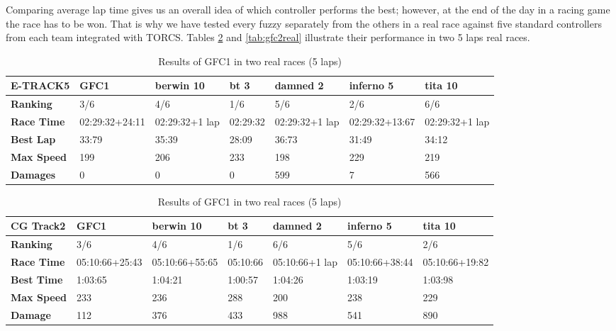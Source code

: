 \documentclass[sigconf]{acmart}
\begin{document}
Comparing average lap time gives us an overall idea of which
controller performs the best; however, at the end of the day in a
racing game the race has to be won. That is why we have tested every
fuzzy separately from the others in a real race against five standard controllers from each team integrated with TORCS. Tables \ref{tab:gfc1real} and \ref{tab:gfc2real}   illustrate their performance in two 5 laps real races. 
\begin{table}[!ht]
	\centering
	{\scriptsize
		\caption{Results of GFC1 in two real races (5 laps)}
		\label{tab:gfc1real}
		\begin{tabular}{|p{2 cm}|p{1.5 cm}|p{1.5 cm}|p{1.5 cm}|p{1.5 cm}|p{1.5 cm}|p{1.5 cm}|}
			\hline \textbf{E-TRACK5} &   \textbf{GFC1} & \textbf{berwin 10} & \textbf{bt 3} &\textbf{damned 2} & \textbf{inferno 5} & \textbf{tita 10}  \\
			\hline \textbf{Ranking} & 3/6&4/6&1/6&5/6&2/6&6/6\\			
			\hline \textbf{Race Time}	& 02:29:32\newline+24:11&02:29:32\newline +1 lap &02:29:32&02:29:32\newline +1 lap &02:29:32\newline+13:67&02:29:32\newline+1 lap\\	
			\hline \textbf{Best Lap}&33:79& 35:39&28:09&36:73&31:49&34:12\\	
			\hline \textbf{Max Speed}& 199&206&233&198&229&219\\	
			\hline \textbf{Damages}& 0&0&0&599&7&566 \\	
			\hline 
		\end{tabular}
		
		\begin{tabular}{|p{2 cm}|p{1.5 cm}|p{1.5 cm}|p{1.5 cm}|p{1.5 cm}|p{1.5 cm}|p{1.5 cm}|}
			\hline \textbf{CG Track2} & \textbf{GFC1}&\textbf{berwin 10} & \textbf{bt 3} &\textbf{damned 2} & \textbf{inferno 5} & \textbf{tita 10}  \\
			\hline \textbf{Ranking} & 3/6&4/6&1/6&6/6&5/6&2/6\\			
			\hline \textbf{Race Time}	&  05:10:66\newline +25:43&  05:10:66\newline+55:65& 05:10:66& 05:10:66\newline+1 lap& 05:10:66\newline+38:44& 05:10:66\newline+19:82\\	
			\hline \textbf{Best Time}& 1:03:65 &1:04:21&1:00:57&1:04:26&1:03:19&1:03:98\\	
			\hline \textbf{Max Speed}& 233&236&288&200&238&229\\
			\hline \textbf{Damage}& 112& 376 & 433&988&541&890\\	
			\hline 
		\end{tabular}
	}
\end{table}
\end{document}

